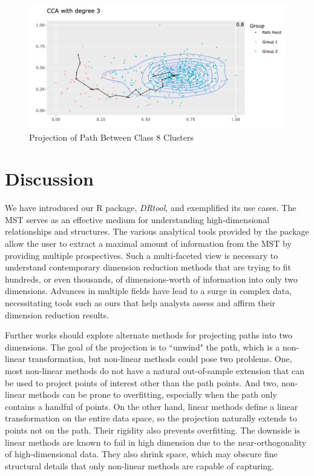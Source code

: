 \documentclass{article}
\begin{document}
{\renewcommand{\figurename}{Figure}
\renewcommand{\thefigure}{8}
\begin{figure}[!t]
\centering
\includegraphics[scale=0.47]{class 8 projection Wong}
\caption{Projection of Path Between Class 8 Clusters}
\end{figure}

\section{Discussion}
We have introduced our R package, \textit{DRtool}, and exemplified its use cases. The MST serves as an effective medium for understanding high-dimensional relationships and structures. The various analytical tools provided by the package allow the user to extract a maximal amount of information from the MST by providing multiple prospectives. Such a multi-faceted view is necessary to understand contemporary dimension reduction methods that are trying to fit hundreds, or even thousands, of dimensions-worth of information into only two dimensions. Advances in multiple fields have lead to a surge in complex data, necessitating tools such as ours that help analysts assess and affirm their dimension reduction results.

Further works should explore alternate methods for projecting paths into two dimensions. The goal of the projection is to ``unwind" the path, which is a non-linear transformation, but non-linear methods could pose two problems. One, most non-linear methods do not have a natural out-of-sample extension that can be used to project points of interest other than the path points. And two, non-linear methods can be prone to overfitting, especially when the path only contains a handful of points. On the other hand, linear methods define a linear transformation on the entire data space, so the projection naturally extends to points not on the path. Their rigidity also prevents overfitting. The downside is linear methods are known to fail in high dimension due to the near-orthogonality of high-dimensional data. They also shrink space, which may obscure fine structural details that only non-linear methods are capable of capturing.

}
\end{document}
